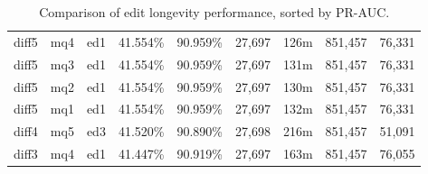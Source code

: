 \begin{sidewaystable}[!ph]
\begin{center}
\begin{tabular}{|c|c|c||c|c||c|c|c|c|}
diff5 & mq4 & ed1 & 41.554\% & 90.959\% & 27,697 & 126m & 851,457 & 76,331 \\
diff5 & mq3 & ed1 & 41.554\% & 90.959\% & 27,697 & 131m & 851,457 & 76,331 \\
diff5 & mq2 & ed1 & 41.554\% & 90.959\% & 27,697 & 130m & 851,457 & 76,331 \\
diff5 & mq1 & ed1 & 41.554\% & 90.959\% & 27,697 & 132m & 851,457 & 76,331 \\
diff4 & mq5 & ed3 & 41.520\% & 90.890\% & 27,698 & 216m & 851,457 & 51,091 \\
diff3 & mq4 & ed1 & 41.447\% & 90.919\% & 27,697 & 163m & 851,457 & 76,055 \\
\hline
\end{tabular}
\end{center}
\caption{Comparison of edit longevity performance,
    sorted by PR-AUC.}
\label{tab:editshoutF}
\end{sidewaystable}
\clearpage
